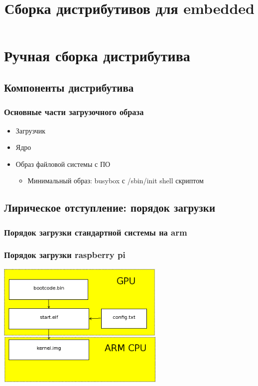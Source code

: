 
\title{Сборка дистрибутивов для embedded}



\begin{frame}
  \frametitle{}
  \titlepage
\end{frame}

\section{Ручная сборка дистрибутива}

\subsection{Компоненты дистрибутива}
\begin{frame}
  \frametitle{Основные части загрузочного образа}
  \begin{itemize}
    \item{Загрузчик}
    \item{Ядро}
    \item{Образ файловой системы с ПО}
      \begin{itemize}
        \item Минимальный образ: busybox с /sbin/init shell скриптом
      \end{itemize}
  \end{itemize}
\end{frame}

\subsection{Лирическое отступление: порядок загрузки}

\begin{frame}
  \frametitle{Порядок загрузки стандартной системы на arm}
\end{frame}

\begin{frame}
  \frametitle{Порядок загрузки raspberry pi}
  \includegraphics[height=6cm]{rpi_boot.png}
\end{frame}

